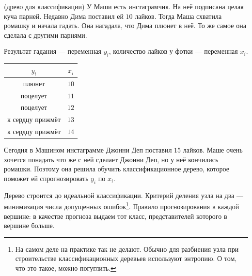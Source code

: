 \documentclass[12pt, a4paper, oneside]{article}
\theoremstyle{plain} %
\theoremstyle{definition}
\begin{document}
\begin{problem}{(древо для классификации)}
У Маши есть инстаграмчик. На неё подписана целая куча парней. Недавно Дима поставил ей $10$ лайков. Тогда Маша схватила ромашку и начала гадать. Она нагадала, что Дима плюнет в неё. То же самое она сделала с другими парнями. 

Результат гадания --- переменная $y_i$, количество лайков у фотки --- переменная $x_i$. 

\begin{center}
	\begin{tabular}{cc}
		$y_i$ & $x_i$ \\
		\hline
		плюнет & $10$ \\
		поцелует & $11$ \\
		поцелует & $12$ \\
		к сердцу прижмёт & $13$ \\
		к сердцу прижмёт & $14$ \\
	\end{tabular}
\end{center}

Сегодня в Машином инстаграмме Джонни Деп поставил $15$ лайков. Маше очень хочется понадать что же с ней сделает Джонни Деп, но у неё кончились ромашки. Поэтому она решила обучить классификационное дерево, которое поможет ей спрогнозировать $y_i$ по $x_i$.

Дерево строится до идеальной классификации. Критерий деления узла на два --- минимизация числа допущенных ошибок\footnote{На самом деле на практике так не делают. Обычно для разбиения узла при строительстве классификационных деревьев используют энтропию. О том, что это такое, можно погуглить.}.  Правило прогнозирования в каждой вершине: в качестве прогноза выдаем тот класс, представителей которого в вершине больше.
\end{problem}
\end{document}
